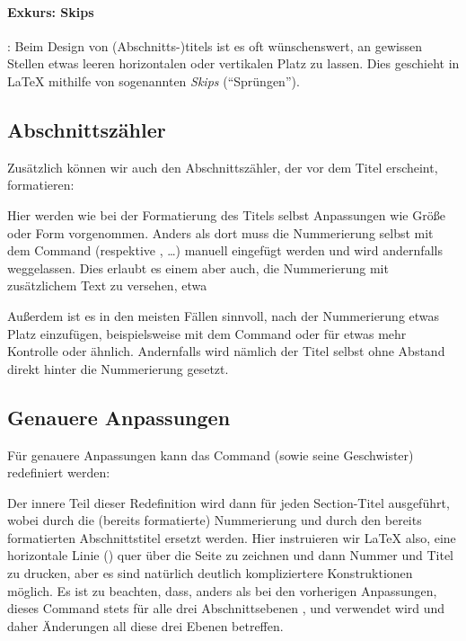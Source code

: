 \paragraph{Exkurs: Skips}: 
Beim Design von (Abschnitts-)titels ist es oft wünschenswert, an gewissen Stellen etwas leeren horizontalen oder vertikalen Platz zu lassen.
Dies geschieht in \LaTeX{} mithilfe von sogenannten \emph{Skips} (\enquote{Sprüngen}).

\subsection{Abschnittszähler}
Zusätzlich können wir auch den Abschnittszähler, der vor dem Titel erscheint, formatieren:
\begin{latexlisting}
\renewcommand*{\sectionformat}{\Large\scshape\thesection\qquad}	
\end{latexlisting}
Hier werden wie bei der Formatierung des Titels selbst Anpassungen wie Größe oder Form vorgenommen.
Anders als dort muss die Nummerierung selbst mit dem Command  (respektive \latexcommand{\thechapter}, \dots) manuell eingefügt werden und wird andernfalls weggelassen.
Dies erlaubt es einem aber auch, die Nummerierung mit zusätzlichem Text zu versehen, etwa
\begin{latexlisting}
\renewcommand*{\sectionformat}{\Large\scshape\thesection . Abschnitt\qquad}	
\end{latexlisting}
Außerdem ist es in den meisten Fällen sinnvoll, nach der Nummerierung etwas Platz einzufügen, beispielsweise mit dem Command  oder für etwas mehr Kontrolle  oder ähnlich.
Andernfalls wird nämlich der Titel selbst ohne Abstand direkt hinter die Nummerierung gesetzt.

\subsection{Genauere Anpassungen}
Für genauere Anpassungen kann das Command  (sowie seine Geschwister) redefiniert werden:
\begin{latexlisting}
	\renewcommand{\sectionlinesformat}[4]{%
	  \rule[-.15\baselineskip]{\linewidth}{.5pt}\par\nobreak%
	  #3%
	  #4%
	}
\end{latexlisting}
Der innere Teil dieser Redefinition wird dann für jeden Section-Titel ausgeführt, wobei  durch die (bereits formatierte) Nummerierung und  durch den bereits formatierten Abschnittstitel ersetzt werden.
Hier instruieren wir \LaTeX{} also, eine horizontale Linie () quer über die Seite zu zeichnen und dann Nummer und Titel zu drucken, aber es sind natürlich deutlich kompliziertere Konstruktionen möglich.
Es ist zu beachten, dass, anders als bei den vorherigen Anpassungen, dieses Command stets für alle drei Abschnittsebenen ,  und  verwendet wird und daher Änderungen all diese drei Ebenen betreffen.

